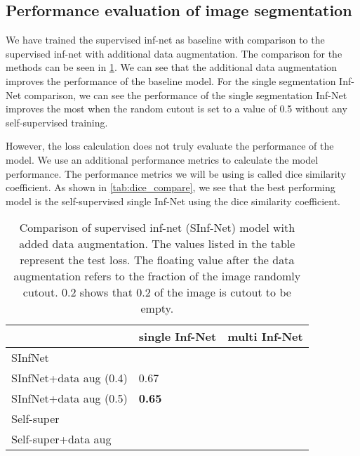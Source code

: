 \subsection{Performance evaluation of image segmentation}
We have trained the supervised inf-net as baseline with comparison to the supervised inf-net with additional data augmentation. The comparison for the methods can be seen in \ref{tab:table_compare}. We can see that the additional data augmentation improves the performance of the baseline model. For the single segmentation Inf-Net comparison, we can see the performance of the single segmentation Inf-Net improves the most when the random cutout is set to a value of 0.5 without any self-supervised training. 

However, the loss calculation does not truly evaluate the performance of the model. We use an additional performance metrics to calculate the model performance. The performance metrics we will be using is called dice similarity coefficient. As shown in \ref{tab:dice_compare}, we see that the best performing model is the self-supervised single Inf-Net using the dice similarity coefficient. 




\begin{table}
	\centering

	\begin{tabular}{|l|l|l|}
		\hline
		& single Inf-Net & multi Inf-Net \\\hline
		SInfNet &  &  \\\hline
		SInfNet+data aug (0.4)& 0.67 &  \\\hline
		SInfNet+data aug (0.5)& \textbf{0.65} & \textbf{} \\\hline
		Self-super &  & \\\hline
		Self-super+data aug & & \\
		\hline
		
	\end{tabular}
	\caption{Comparison of supervised inf-net (SInf-Net) model with added data augmentation. The values listed in the table represent the test loss. The floating value  after the data augmentation refers to the fraction of the image randomly cutout. 0.2 shows that 0.2 of the image is cutout to be empty. }
	\label{tab:table_compare}
\end{table}

